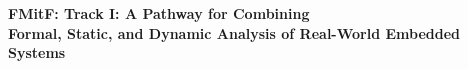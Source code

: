 \documentclass[11pt]{article}
\begin{document}
\begin{center}
  \Large\bf FMitF: Track I: A Pathway for Combining\\Formal, Static, and
  Dynamic Analysis of Real-World Embedded Systems
\end{center}














\newpage
\setcounter{page}{1}



\end{document}

